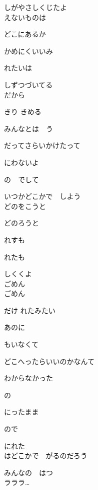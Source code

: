 しがやさしくじたよ
\\

えないものは

どこにあるか

かめにくいいみ

れたいは

しずつづいてる
\\

だから

きり きめる

みんなとは　う

だってさらいかけたって

にわないよ

の　でして

いつかどこかで　しよう
\\

どのをこうと

どのろうと

れすも

れたも

しくくよ
\\

ごめん
\\

ごめん

だけ れたみたい

あのに

もいなくて

どこへったらいいのかなんて

わからなかった

の

にったまま

ので

にれた
\\

はどこかで　がるのだろう

みんなの　はつ
\\

ラララ…
\\
